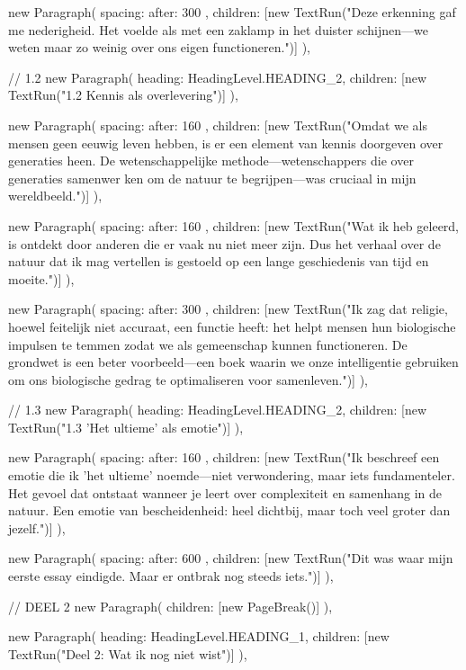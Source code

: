 {{      new Paragraph({
        spacing: { after: 300 },
        children: [new TextRun("Deze erkenning gaf me nederigheid. Het voelde als met een zaklamp in het duister schijnen—we weten maar zo weinig over ons eigen functioneren.")]
      }),

      // 1.2
      new Paragraph({
        heading: HeadingLevel.HEADING_2,
        children: [new TextRun("1.2 Kennis als overlevering")]
      }),

      new Paragraph({
        spacing: { after: 160 },
        children: [new TextRun("Omdat we als mensen geen eeuwig leven hebben, is er een element van kennis doorgeven over generaties heen. De wetenschappelijke methode—wetenschappers die over generaties samenwer ken om de natuur te begrijpen—was cruciaal in mijn wereldbeeld.")]
      }),

      new Paragraph({
        spacing: { after: 160 },
        children: [new TextRun("Wat ik heb geleerd, is ontdekt door anderen die er vaak nu niet meer zijn. Dus het verhaal over de natuur dat ik mag vertellen is gestoeld op een lange geschiedenis van tijd en moeite.")]
      }),

      new Paragraph({
        spacing: { after: 300 },
        children: [new TextRun("Ik zag dat religie, hoewel feitelijk niet accuraat, een functie heeft: het helpt mensen hun biologische impulsen te temmen zodat we als gemeenschap kunnen functioneren. De grondwet is een beter voorbeeld—een boek waarin we onze intelligentie gebruiken om ons biologische gedrag te optimaliseren voor samenleven.")]
      }),

      // 1.3
      new Paragraph({
        heading: HeadingLevel.HEADING_2,
        children: [new TextRun("1.3 'Het ultieme' als emotie")]
      }),

      new Paragraph({
        spacing: { after: 160 },
        children: [new TextRun("Ik beschreef een emotie die ik 'het ultieme' noemde—niet verwondering, maar iets fundamenteler. Het gevoel dat ontstaat wanneer je leert over complexiteit en samenhang in de natuur. Een emotie van bescheidenheid: heel dichtbij, maar toch veel groter dan jezelf.")]
      }),

      new Paragraph({
        spacing: { after: 600 },
        children: [new TextRun("Dit was waar mijn eerste essay eindigde. Maar er ontbrak nog steeds iets.")]
      }),

      // DEEL 2
      new Paragraph({ children: [new PageBreak()] }),

      new Paragraph({
        heading: HeadingLevel.HEADING_1,
        children: [new TextRun("Deel 2: Wat ik nog niet wist")]
      }),

}}
